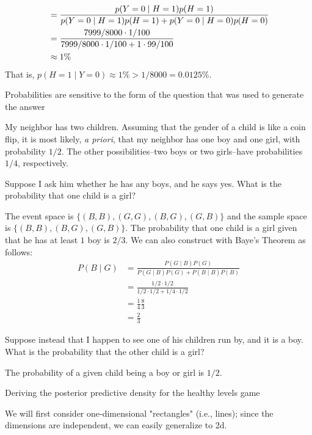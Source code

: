 \begin{exercise}
\begin{exercise}
\begin{align}
			&= \frac{p(Y = 0\mid H = 1) p(H = 1)}{p(Y = 0\mid H = 1) p(H = 1) + p(Y = 0\mid H = 0) p(H = 0)}
			\notag\\
			&= \frac{7999 / 8000\cdot 1 / 100}{7999 / 8000\cdot 1 / 100 + 1 \cdot 99 / 100}\notag\\
			&\approx 1\%\notag
		\end{align}
	That is, \(p(H = 1\mid Y = 0) \approx 1\% > 1 / 8000 = 0.0125\%\).
	\end{exercise}
\item Probabilities are sensitive to the form of the question that was used to generate the answer
	\par\smallskip
	My neighbor has two children. Assuming that the gender of a child is like a coin flip, it is most likely, 
	\textit{a priori}, that my neighbor has one boy and one girl, with probability \(1 / 2\). The other possibilities--two
	boys or two girls--have probabilities \(1 / 4\), respectively.
	\begin{exercise}
	\item
		Suppose I ask him whether he has any boys, and he says yes. What is the probability that one child is a 
		girl?
		\par\smallskip
		The event space is \(\{(B, B), (G, G), (B,G), (G, B)\}\) and the sample space is 
		 \(\{(B, B), (B,G), (G, B)\}\). The probability that one child is a girl given that he has at least \(1\) boy is
		 \(2 / 3\). We can also construct with Baye's Theorem as follows:
		 \begin{align*}
		 P(B\mid G) &= \frac{P(G\mid B)P(G)}{P(G\mid B)P(G) + P(B\mid B)P(B)}\\
		 &= \frac{1 / 2\cdot 1 / 2}{1 / 2\cdot 1 / 2 + 1 / 4\cdot 1 / 2}\\
		 &= \frac{1}{4}\frac{8}{3}\\
		 &= \frac{2}{3}
		 \end{align*}
	\item
		Suppose instead that I happen to see one of his children run by, and it is a boy. What is the probability that
		the other child is a girl?
		\par\smallskip
		The probability of a given child being a boy or girl is \(1 / 2\).
	\end{exercise}
\item Deriving the posterior predictive density for the healthy levels game
	\par\smallskip
	We will first consider one-dimensional "rectangles" (i.e., lines); since the dimensions are independent, we can
	easily generalize to 2d.

\end{exercise}
